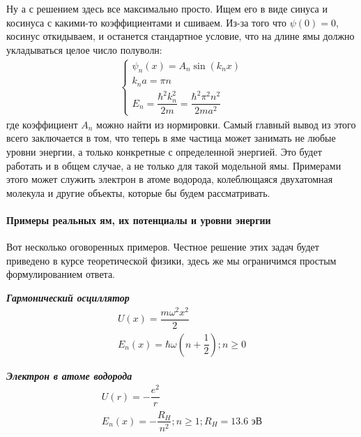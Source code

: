 \documentclass[12pt]{article}
\begin{document}
Ну а с решением здесь все максимально просто. Ищем его в виде синуса и косинуса с какими-то коэффициентами и сшиваем. Из-за того что $\psi(0) = 0$, косинус откидываем, и останется стандартное условие, что на длине ямы должно укладываться целое число полуволн:
\begin{gather}
\label{eq:sem_04_energy_in_hole}
    \begin{cases}
         \psi_n(x) = A_n \sin(k_nx)\\
         k_na = \pi n\\[5pt]
         E_n = \dfrac{\hbar^2k_n^2}{2m} = \dfrac{\hbar^2\pi^2n^2}{2ma^2}
    \end{cases}
\end{gather}
где коэффициент $A_n$ можно найти из нормировки. Самый главный вывод из этого всего заключается в том, что теперь в яме частица может занимать не любые уровни энергии, а только конкретные с определенной энергией. Это будет работать и в общем случае, а не только для такой модельной ямы. Примерами этого может служить электрон в атоме водорода, колеблющаяся двухатомная молекула и другие объекты, которые бы будем рассматривать.

\paragraph{Примеры реальных ям, их потенциалы и уровни энергии}
Вот несколько оговоренных примеров. Честное решение этих задач будет приведено в курсе теоретической физики, здесь же мы ограничимся простым формулированием ответа.

\vspace{3mm}
\noindent
\textit{\textbf{Гармонический осциллятор}} 
\begin{gather*}
    U(x) = \dfrac{m\omega^2x^2}{2}\\
    E_n(x) = \hbar\omega(n+\dfrac{1}{2}); n\ge 0
\end{gather*}

\noindent
\textit{\textbf{Электрон в атоме водорода}} 
\begin{gather*}
    U(r) = -\dfrac{e^2}{r}\\
    E_n(x) = -\dfrac{R_H}{n^2}; n\ge 1; R_H = 13.6 \text{ эВ} 
\end{gather*}
\end{document}
